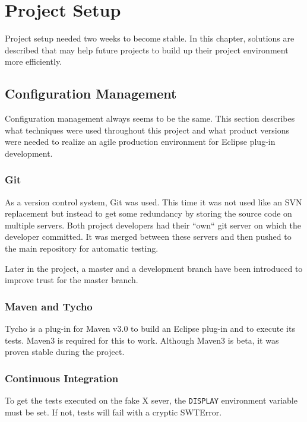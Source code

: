 \chapter{Project Setup}
\thispagestyle{fancy}

Project setup needed two weeks to become stable. In this chapter, solutions are 
described that may help future projects to build up their project environment 
more efficiently.

\section{Configuration Management}

Configuration management always seems to be the same. This section describes 
what techniques were used throughout this project and what product versions were 
needed to realize an agile production environment for Eclipse plug-in development.

\subsection{Git}

As a version control system, Git\cite{GIT} was used. This time it was not used like an SVN
replacement but instead to get some redundancy by storing the source code on
multiple servers. Both project developers had their ``own`` git server on which
the developer committed. It was merged between these servers and then pushed to
the main repository for automatic testing.

Later in the project, a master and a development branch have been introduced to 
improve trust for the master branch.

\subsection{Maven and Tycho}

Tycho\cite{tycho} is a plug-in for Maven\cite{maven} v3.0 to build an Eclipse plug-in and to execute its tests.
Maven3 is required for this to work. Although Maven3 is beta, it was proven
stable during the project.

\subsection{Continuous Integration}

To get the tests executed on the fake X sever, the \texttt{DISPLAY} environment
variable must be set. If not, tests will fail with a cryptic
SWTError.

